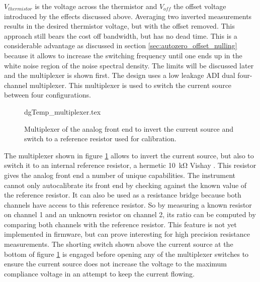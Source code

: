 $V_{thermistor}$ is the voltage across the thermistor and $V_{off}$ the offset voltage introduced by the effects discussed above. Averaging two inverted measurements results in the desired thermistor voltage, but with the offset removed. This approach still bears the cost off bandwidth, but has no dead time. This is a considerable advantage as discussed in section \ref{sec:autozero_offset_nulling} because it allows to increase the switching frequency until one ends up in the white noise region of the noise spectral density. The limits will be discussed later and the multiplexer is shown first. The design uses a low leakage ADI  \cite{datasheet_MAX329} dual four-channel multiplexer. This multiplexer is used to switch the current source between four configurations.
\begin{figure}[ht]
    \centering
        {dgTemp_multiplexer.tex}
    \caption{Multiplexer of the analog front end to invert the current source and switch to a reference resistor used for calibration.}
    \label{fig:dgTemp_multiplexer}
\end{figure}

The multiplexer shown in figure \ref{fig:dgTemp_multiplexer} allows to invert the current source, but also to switch it to an internal reference resistor, a hermetic \qty{10}{\kilo\ohm} Vishay  \cite{datasheet_vhp101}. This resistor gives the analog front end a number of unique capabilities. The instrument cannot only autocalibrate its front end by checking against the known value of the reference resistor. It can also be used as a resistance bridge because both channels have access to this reference resistor. So by measuring a known resistor on channel \num{1} and an unknown resistor on channel \num{2}, its ratio can be computed by comparing both channels with the reference resistor. This feature is not yet implemented in firmware, but can prove interesting for high precision resistance measurements. The shorting switch shown above the current source at the bottom of figure \ref{fig:dgTemp_multiplexer} is engaged before opening any of the multiplexer switches to ensure the current source does not increase the voltage to the maximum compliance voltage in an attempt to keep the current flowing.

